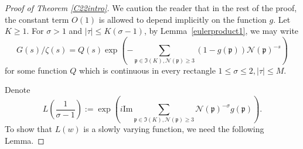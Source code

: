 \documentclass[11pt]{amsart}
\theoremstyle{definition}
\newcommand{\NN}{{\mathcal N}}
\newcommand{\Z}{{\mathbb Z}}
\newcommand{\mf}{\mathfrak}
\begin{document}
\begin{proof}[Proof of Theorem \ref{C22intro}]
   We caution the reader that in the rest of the proof, the constant term $O(1)$ is allowed to depend implicitly on the function $g$.
   Let $K\geq 1$. For $\sigma>1$ and $\vert\tau\vert \leq K(\sigma-1)$, by Lemma~\ref{eulerproduct1}, we may write 
   \begin{equation}\label{e41}
  G(s)/\zeta(s)=Q(s)\exp\left(-\sum_{\mf p \in \mf I(K), \NN(\mf p)\geq 3}(1-g(\mf p))\NN(\mf p)^{-s}\right)   \end{equation}
   for some function $Q$ which is continuous in every rectangle $1\leq \sigma\leq 2, \vert\tau\vert\leq M$. 
   
   
   
   




%

   
   
   
   Denote
   $$L\left(\frac{1}{\sigma-1}\right):=\exp\left(i\text{Im} \sum_{\mf p \in \mf I(K), \NN(\mf p)\geq 3}\NN(\mf p)^{-\sigma}g(\mf p)\right).$$
To show that $L(w)$ is a slowly varying function, we need the following Lemma.



\end{proof}
\end{document}
